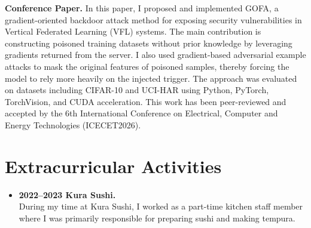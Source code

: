\documentclass[letterpaper,11pt]{article}
\newcommand{\projectEntry}[2]{%
  \textbf{#1.} #2\par\vspace{0.62em}
}
\begin{document}
\projectEntry{Conference Paper}{In this paper, I proposed and implemented GOFA, a gradient-oriented backdoor attack method for exposing security vulnerabilities in Vertical Federated Learning 
(VFL) systems. The main contribution is constructing poisoned training datasets without prior knowledge by leveraging gradients returned from the server. I also used gradient-based adversarial example 
attacks to mask the original features of poisoned samples, thereby forcing the model to rely more heavily on the injected trigger. The approach was evaluated on datasets including CIFAR-10 and UCI-HAR using Python, PyTorch, TorchVision, and CUDA acceleration. This work has been peer-reviewed and accepted by the 6th International 
Conference on Electrical, Computer and Energy Technologies (ICECET2026).}


\section{Extracurricular Activities}
%
 \begin{itemize}
   \item \textbf{2022--2023 Kura Sushi.}\\
   During my time at Kura Sushi, I worked as a part-time kitchen staff member where I was primarily responsible for preparing 
   sushi and making tempura. 
\end{itemize}
\end{document}
